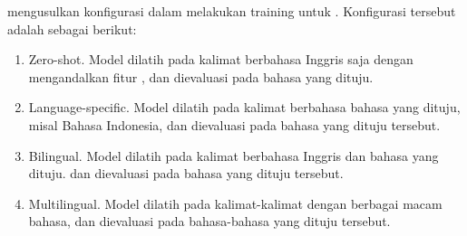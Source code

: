 \textcite{blloshmi2020} mengusulkan konfigurasi dalam melakukan training untuk \amrparsing{} \crosslingual{}.
Konfigurasi tersebut adalah sebagai berikut:
\begin{enumerate}
  \item Zero-shot.
  Model dilatih pada kalimat berbahasa Inggris saja dengan mengandalkan fitur , dan dievaluasi pada bahasa yang dituju.

  \item Language-specific.
  Model dilatih pada kalimat berbahasa bahasa yang dituju, misal Bahasa Indonesia, dan dievaluasi pada bahasa yang dituju tersebut.

  \item Bilingual.
  Model dilatih pada kalimat berbahasa Inggris dan bahasa yang dituju. dan dievaluasi pada bahasa yang dituju tersebut.

  \item Multilingual.
  Model dilatih pada kalimat-kalimat dengan berbagai macam bahasa, dan dievaluasi pada bahasa-bahasa yang dituju tersebut.
\end{enumerate}
